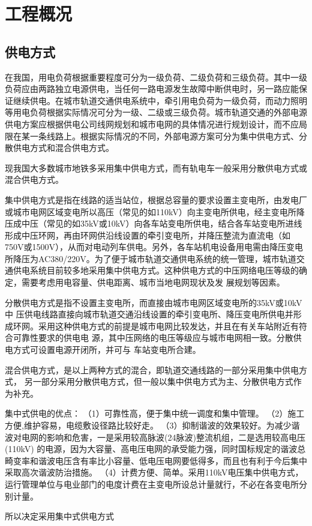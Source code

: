 \chapter{工程概况}
\section{供电方式}
在我国，用电负荷根据重要程度可分为一级负荷、二级负荷和三级负荷。其中一级负荷应由两路独立电源供电，当任何一路电源发生故障中断供电时，另一路应能保证继续供电。在城市轨道交通供电系统中，牵引用电负荷为一级负荷，而动力照明等用电负荷根据实际情况可分为一级、二级或三级负荷。城市轨道交通的外部电源供电方案应根据供电公司线网规划和城市电网的具体情况进行规划设计，而不应局限在某一条线路上。根据实际情况的不同，外部电源方案可分为集中供电方式、分散供电方式和混合供电方式。
\par 现我国大多数城市地铁多采用集中供电方式，而有轨电车一般采用分散供电方式或混合供电方式。\par
集中供电方式是指在线路的适当站位，根据总容量的要求设置主变电所，由发电厂或城市电网区域变电所以高压（常见的如110kV）向主变电所供电，经主变电所降压成中压（常见的如35kV或10kV）向各车站变电所供电，结合各车站变电所进线形成中压环网，再由环网供沿线设置的牵引变电所，并降压整流为直流电（如750V或1500V），从而对电动列车供电。另外，各车站机电设备用电需由降压变电所降压为AC380/220V。为了便于城市轨道交通供电系统的统一管理，城市轨道交通供电系统目前较多地采用集中供电方式。这种供电方式的中压网络电压等级的确定，需要考虑用电容量、供电距离、城市当地电网现状及发
展规划等因素。\par
分散供电方式是指不设置主变电所，而直接由城市电网区域变电所的35kV或10kV 中
压供电线路直接向城市轨道交通沿线设置的牵引变电所、降压变电所供电并形成环网。采用这种供电方式的前提是城市电网比较发达，并且在有关车站附近有符合可靠性要求的供电电
源，其中压网络的电压等级应与城市电网相一致。分散供电方式可设置电源开闭所，并可与
车站变电所合建。\par
混合供电方式，是以上两种方式的混合，即轨道交通线路的一部分采用集中供电方式，
另一部分采用分散供电方式，但一般以集中供电方式为主、分散供电方式作为补充。\par
集中式供电的优点：\newline
（1）可靠性高，便于集中统一调度和集中管理。\newline
（2）施工方便,维护容易，电缆敷设径路比较好走。\newline
（3）抑制谐波的效果较好。为减少谐波对电网的影响和危害，一是采用较高脉波(24脉波)整流机组，二是选用较高电压(110kV) 的电源，因为大容量、高电压电网的承受能力强，同时国标规定的谐波总畸变率和谐波电压含有率比小容量、低电压电网要低得多，而且也有利于今后集中采取高次谐波防治措施。\newline
（4）计费方便、简单。采用110kV电压集中供电方式，运行管理单位与电业部门的电度计费在主变电所设总计量就行，不必在各变电所分别计量。\par 
所以决定采用集中式供电方式
